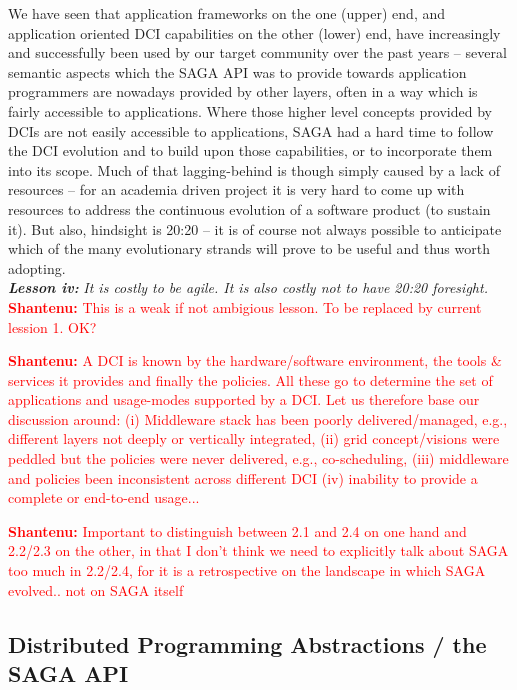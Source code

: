 \documentclass{article}
\newcommand{\I}[1]{\textit{#1}}
\newcommand{\B}[1]{\textbf{#1}}
\newcommand{\BI}[1]{\textbf{\textit{#1}}}
\newcommand{\jhanote}[1]{{\textcolor{red}{     \B{Shantenu:} #1 }}}
\newcommand{\jhanote}[1]{}
\begin{document}
  We have seen that application frameworks on the one (upper) end, and
  application oriented DCI capabilities on the other (lower) end, have
  increasingly and successfully been used by our target community over the past
  years -- several semantic aspects which the SAGA API was to provide towards
  application programmers are nowadays provided by other layers, often in a way
  which is fairly accessible to applications.  Where those higher level concepts
  provided by DCIs are not easily accessible to applications, SAGA had a hard
  time to follow the DCI evolution and to build upon those capabilities, or to
  incorporate them into its scope.  Much of that lagging-behind is though simply
  caused by a lack of resources -- for an academia driven project it is very
  hard to come up with resources to address the continuous evolution of
  a software product (to sustain it).  But also, hindsight is 20:20 -- it is of
  course not always possible to anticipate which of the many evolutionary
  strands will prove to be useful and thus worth adopting.\\
  \BI{Lesson iv:} \I{It is costly to be agile. It is also costly not to have
  20:20 foresight.} \jhanote{This is a weak if not ambigious lesson. To be
  replaced by current lession 1. OK?}

  \jhanote{A DCI is known by the hardware/software environment, the tools \&
  services it provides and finally the policies. All these go to determine the
  set of applications and usage-modes supported by a DCI. Let us therefore base
  our discussion around: (i) Middleware stack has been poorly delivered/managed,
  e.g., different layers not deeply or vertically integrated, (ii) grid
  concept/visions were peddled but the policies were never delivered, e.g.,
  co-scheduling, (iii) middleware and policies been inconsistent across
  different DCI (iv) inability to provide a complete or end-to-end usage...}
  

  \jhanote{Important to distinguish between 2.1 and 2.4 on one hand and
  2.2/2.3 on the other, in that I don't think we need to explicitly talk about
  SAGA too much in 2.2/2.4, for it is a retrospective on the landscape in
  which SAGA evolved.. not on SAGA itself}
  
 \subsection{Distributed Programming Abstractions / the SAGA API}
\end{document}
